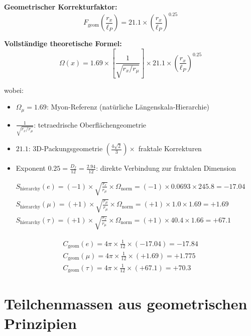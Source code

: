 \documentclass[12pt,a4paper]{article}
\numberwithin{equation}{section}
\newcommand{\Cgeom}{C_{\text{geom}}}
\newcommand{\Df}{D_f}
\newcommand{\lP}{\ell_P}
\newcommand{\Omegafactor}{\Omega}
\begin{document}
	\textbf{Geometrischer Korrekturfaktor:}
	\begin{equation}
		F_{\text{geom}}\left(\frac{r_x}{\lP}\right) = 21.1 \times \left(\frac{r_x}{\lP}\right)^{0.25}
		\label{eq:f_geom}
	\end{equation}
	
	\textbf{Vollständige theoretische Formel:}
	\begin{equation}
		\Omegafactor(x) = 1.69 \times \left[\frac{1}{\sqrt{r_x/r_\mu}}\right] \times 21.1 \times \left(\frac{r_x}{\lP}\right)^{0.25}
		\label{eq:omega_complete}
	\end{equation}
	
	wobei:
	\begin{itemize}
		\item $\Omega_\mu = 1.69$: Myon-Referenz (natürliche Längenskala-Hierarchie)
		\item $\frac{1}{\sqrt{r_x/r_\mu}}$: tetraedrische Oberflächengeometrie
		\item $21.1$: 3D-Packungsgeometrie $\left(\frac{4\sqrt{2}}{3}\right) \times$ fraktale Korrekturen
		\item Exponent $0.25 = \frac{\Df}{12} = \frac{2.94}{12}$: direkte Verbindung zur fraktalen Dimension
	\end{itemize}
	
	\begin{align}
		S_{\text{hierarchy}}(e) = (-1) \times \sqrt{\frac{r_e}{r_\mu}} \times \Omegafactor_{\text{norm}} = (-1) \times 0.0693 \times 245.8 = -17.04\\
		S_{\text{hierarchy}}(\mu) = (+1) \times \sqrt{\frac{r_\mu}{r_\mu}} \times \Omegafactor_{\text{norm}} = (+1) \times 1.0 \times 1.69 = +1.69\\
		S_{\text{hierarchy}}(\tau) = (+1) \times \sqrt{\frac{r_\tau}{r_\mu}} \times \Omegafactor_{\text{norm}} = (+1) \times 40.4 \times 1.66 = +67.1
		\label{eq:signature_factors}
	\end{align}
	
	\begin{align}
		\Cgeom(e) = 4\pi \times \frac{1}{12} \times (-17.04) = -17.84\\
		\Cgeom(\mu) = 4\pi \times \frac{1}{12} \times (+1.69) = +1.775\\
		\Cgeom(\tau) = 4\pi \times \frac{1}{12} \times (+67.1) = +70.3
		\label{eq:cgeom_values}
	\end{align}
	
	\section{Teilchenmassen aus geometrischen Prinzipien}
	
\end{document}
